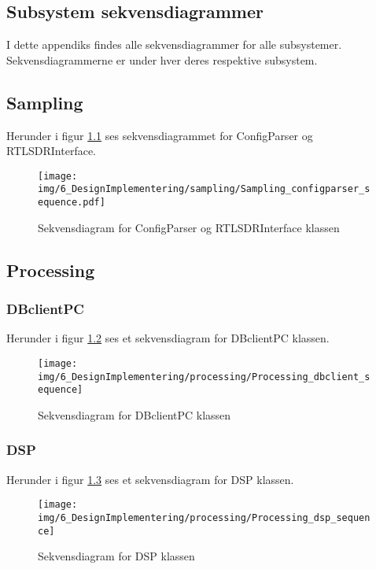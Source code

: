\begin{appendices}
\chapter{Subsystem sekvensdiagrammer} \label{appendix::subsystem_sekvensdiagrammer}

I dette appendiks findes alle sekvensdiagrammer for alle subsystemer. Sekvensdiagrammerne er under hver deres respektive subsystem.

\pagebreak

\section{Sampling}
Herunder i figur \ref{fig:configparser_sequence} ses sekvensdiagrammet for ConfigParser og RTLSDRInterface.
\begin{figure}[H]
	\centering
	\texttt{[image: img/6\_DesignImplementering/sampling/Sampling\_configparser\_sequence.pdf]}
	\caption{Sekvensdiagram for ConfigParser og RTLSDRInterface klassen}
	\label{fig:configparser_sequence}
\end{figure}


\pagebreak


\section{Processing}
\subsection{DBclientPC}
Herunder i figur \ref{fig:DBclientPC_sequence} ses et sekvensdiagram for DBclientPC klassen.
\begin{figure}[H]
	\centering
	\texttt{[image: img/6\_DesignImplementering/processing/Processing\_dbclient\_sequence]}
	\caption{Sekvensdiagram for DBclientPC klassen}
	\label{fig:DBclientPC_sequence}
\end{figure}

\pagebreak

\subsection{DSP}
Herunder i figur \ref{fig:DSP_sequence} ses et sekvensdiagram for DSP klassen.
\begin{figure}[H]
	\centering
	\texttt{[image: img/6\_DesignImplementering/processing/Processing\_dsp\_sequence]}
	\caption{Sekvensdiagram for DSP klassen}
	\label{fig:DSP_sequence}
\end{figure}


\end{appendices}
